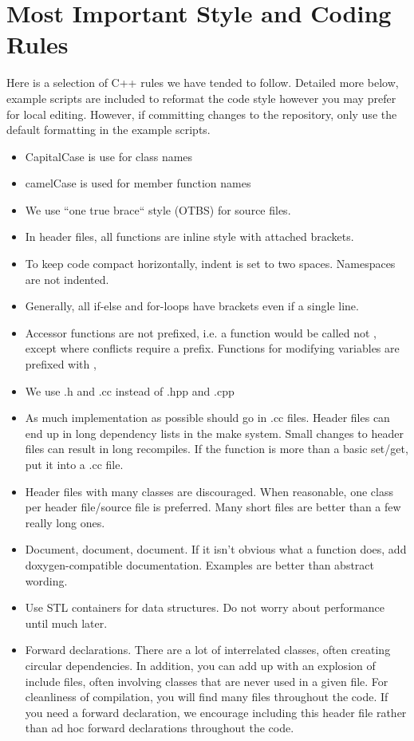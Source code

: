 \section{Most Important Style and Coding Rules}\label{sec:stylerules}
Here is a selection of C++ rules we have tended to follow.  
Detailed more below, example scripts are included to reformat the code style however you may prefer for local editing.
However, if committing changes to the repository, only use the default formatting in the example scripts.
\begin{itemize}
\item CapitalCase is use for class names
\item camelCase is used for member function names
\item We use ``one true brace`` style (OTBS) for source files. 
\item In header files, all functions are inline style with attached brackets.
\item To keep code compact horizontally, indent is set to two spaces. Namespaces are not indented.
\item Generally, all if-else and for-loops have brackets even if a single line.
\item Accessor functions are not prefixed, i.e. a function would be called  not , except
where conflicts require a prefix. Functions for modifying variables are prefixed with ,
\item We use .h and .cc instead of .hpp and .cpp
\item As much implementation as possible should go in .cc files.
	Header files can end up in long dependency lists in the make system.  
	Small changes to header files can result in long recompiles.
	If the function is more than a basic set/get, put it into a .cc file.
\item Header files with many classes are discouraged.  When reasonable, one class per header file/source file is preferred.
	 Many short files are better than a few really long ones.
\item Document, document, document.  If it isn't obvious what a function does, add doxygen-compatible documentation.
	Examples are better than abstract wording.
\item Use STL containers for data structures.  Do not worry about performance until much later.
\item Forward declarations.  There are a lot of interrelated classes, often creating circular dependencies. In addition, you can add up with an explosion of include files, often involving classes that are never used in a given  file.  For cleanliness of compilation, you will find many  files throughout the code. If you need a forward declaration, we encourage including this header file rather than ad hoc forward declarations throughout the code.
\end{itemize}

